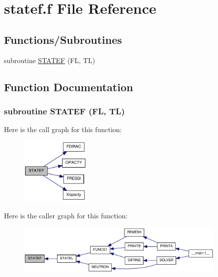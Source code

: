 \hypertarget{statef_8f}{
\section{statef.f File Reference}
\label{statef_8f}
}
\subsection*{Functions/Subroutines}
\begin{DoxyCompactItemize}
\item 
subroutine \hyperlink{statef_8f_aef9263ee691a24244d7b4043ef5c32e8}{STATEF} (FL, TL)
\end{DoxyCompactItemize}


\subsection{Function Documentation}
\hypertarget{statef_8f_aef9263ee691a24244d7b4043ef5c32e8}{
\subsubsection[{STATEF}]{\setlength{\rightskip}{0pt plus 5cm}subroutine STATEF (FL, \/  TL)}}
\label{statef_8f_aef9263ee691a24244d7b4043ef5c32e8}


Here is the call graph for this function:\nopagebreak
\begin{figure}[H]
\begin{center}
\leavevmode
\includegraphics[width=97pt]{statef_8f_aef9263ee691a24244d7b4043ef5c32e8_cgraph}
\end{center}
\end{figure}


Here is the caller graph for this function:\nopagebreak
\begin{figure}[H]
\begin{center}
\leavevmode
\includegraphics[width=290pt]{statef_8f_aef9263ee691a24244d7b4043ef5c32e8_icgraph}
\end{center}
\end{figure}

